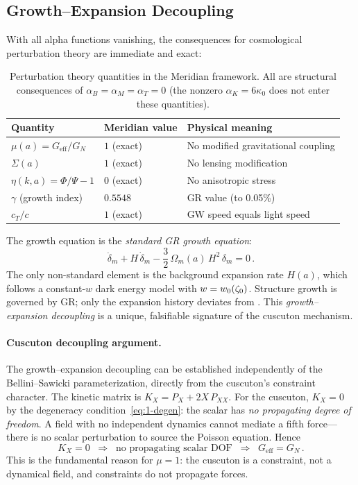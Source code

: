\subsection{Growth--Expansion Decoupling}
\label{sec:1-growth-decoupling}

With all alpha functions vanishing, the consequences for cosmological perturbation theory are immediate and exact:

\begin{table}[h]
\centering
\caption{Perturbation theory quantities in the Meridian framework. All are structural consequences of $\alpha_B = \alpha_M = \alpha_T = 0$ (the nonzero $\alpha_K = 6\kappa_0$ does not enter these quantities).}
\label{tab:1-perturbation-summary}
\begin{tabular}{@{}lll@{}}
\toprule
Quantity & Meridian value & Physical meaning \\
\midrule
$\mu(a) = G_{\mathrm{eff}}/G_N$ & $1$ (exact) & No modified gravitational coupling \\
$\Sigma(a)$ & $1$ (exact) & No lensing modification \\
$\eta(k,a) = \Phi/\Psi - 1$ & $0$ (exact) & No anisotropic stress \\
$\gamma$ (growth index) & $0.5548$ & GR value (to 0.05\%) \\
$c_T/c$ & $1$ (exact) & GW speed equals light speed \\
\bottomrule
\end{tabular}
\end{table}

\noindent The growth equation is the \emph{standard GR growth equation}:
\begin{equation}
\label{eq:1-growth-eq}
\ddot{\delta}_m + H\,\dot{\delta}_m - \frac{3}{2}\,\Omega_m(a)\,H^2\,\delta_m = 0\,.
\end{equation}
The only non-standard element is the background expansion rate $H(a)$, which follows a constant-$w$ dark energy model with $w = w_0(\zeta_0)$. Structure growth is governed by GR; only the expansion history deviates from \LCDM. This \emph{growth--expansion decoupling} is a unique, falsifiable signature of the cuscuton mechanism.

\paragraph{Cuscuton decoupling argument.} The growth--expansion decoupling can be established independently of the Bellini--Sawicki parameterization, directly from the cuscuton's constraint character. The kinetic matrix is $K_X = P_X + 2X\,P_{XX}$. For the cuscuton, $K_X = 0$ by the degeneracy condition~\eqref{eq:1-degen}: the scalar has \emph{no propagating degree of freedom}. A field with no independent dynamics cannot mediate a fifth force---there is no scalar perturbation to source the Poisson equation. Hence
\begin{equation}
\label{eq:1-cuscuton-decoupling}
K_X = 0 \;\;\Longrightarrow\;\; \text{no propagating scalar DOF} \;\;\Longrightarrow\;\; G_{\mathrm{eff}} = G_N\,.
\end{equation}
This is the fundamental reason for $\mu = 1$: the cuscuton is a constraint, not a dynamical field, and constraints do not propagate forces.

